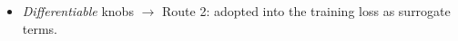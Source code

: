 \begin{itemize}
    \item \emph{Differentiable} knobs $\to$ Route 2: adopted into the training loss as surrogate terms. 

\end{itemize}
